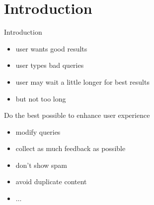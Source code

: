 \section{Introduction}

\begin{frame}{Introduction}

\begin{itemize}[<+->]
  \item user wants good results
  \item user types bad queries
  \item user may wait a little longer for best results
  \item but not too long
\end{itemize}

\pause

Do the best possible to enhance user experience

\begin{itemize}
  \item modify queries
  \item collect as much feedback as possible
  \item don't show spam
  \item avoid duplicate content
  \item $\ldots$
\end{itemize}

\end{frame}

